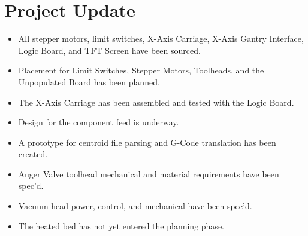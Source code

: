 \section{Project Update}
\begin{itemize}
    \item All stepper motors, limit switches, X-Axis Carriage, X-Axis Gantry Interface, Logic Board, and TFT Screen have been sourced.
    \item Placement for Limit Switches, Stepper Motors, Toolheads, and the Unpopulated Board has been planned.
    \item The X-Axis Carriage has been assembled and tested with the Logic Board.
    \item Design for the component feed is underway.
    \item A prototype for centroid file parsing and G-Code translation has been created.
    \item Auger Valve toolhead mechanical and material requirements have been spec'd.
    \item Vacuum head power, control, and mechanical have been spec'd.
    \item The heated bed has not yet entered the planning phase.
\end{itemize} 

